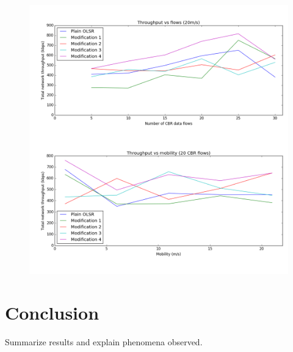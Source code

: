 \documentclass[12pt,a4paper]{article}
\begin{document}
\begin{figure}[ht]
\centering
\includegraphics[width=\textwidth]{figure_1}
\end{figure}

\section{Conclusion}
Summarize results and explain phenomena observed.



\end{document}
